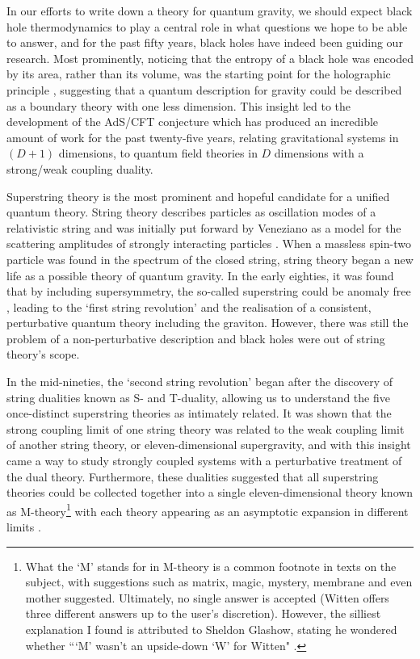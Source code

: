 In our efforts to write down a theory for quantum gravity, we should expect black hole thermodynamics to play a central role in what questions we hope to be able to answer, and for the past fifty years, black holes have indeed been guiding our research. Most prominently, noticing that the entropy of a black hole was encoded by its area, rather than its volume, was the starting point for the holographic principle \cite{tHooft:1993dmi, Susskind:1994vu}, suggesting that a quantum description for gravity could be described as a boundary theory with one less dimension. This insight led to the development of the AdS/CFT conjecture \cite{Maldacena:1997re, Witten:1998qj} which has produced an incredible amount of work for the past twenty-five years, relating gravitational systems in $(D+1)$ dimensions, to quantum field theories in $D$ dimensions with a strong/weak coupling duality. 

Superstring theory \cite{Green:1987sp, Polchinski:1998rr} is the most prominent and hopeful candidate for a unified quantum theory. String theory describes particles as oscillation modes of a relativistic string and was initially put forward by Veneziano as a model for the scattering amplitudes of strongly interacting particles \cite{Veneziano:1968yb}. When a massless spin-two particle was found in the spectrum of the closed string, string theory began a new life as a possible theory of quantum gravity. In the early eighties, it was found that by including supersymmetry, the so-called superstring could be anomaly free \cite{Green:1981yb, Green:1984sg}, leading to the `first string revolution' and the realisation of a consistent, perturbative quantum theory including the graviton. However, there was still the problem of a non-perturbative description and black holes were out of string theory's scope. 

In the mid-nineties, the `second string revolution' began after the discovery of string dualities known as S- and T-duality, allowing us to understand the five once-distinct superstring theories as intimately related. It was shown that the strong coupling limit of one string theory was related to the weak coupling limit of another string theory, or eleven-dimensional supergravity, and with this insight came a way to study strongly coupled systems with a perturbative treatment of the dual theory. Furthermore, these dualities suggested that all superstring theories could be collected together into a single eleven-dimensional theory known as M-theory\footnote{What the `M' stands for in M-theory is a common footnote in texts on the subject, with suggestions such as matrix, magic, mystery, membrane and even mother suggested. Ultimately, no single answer is accepted (Witten offers three different answers up to the user's discretion). However, the silliest explanation I found is attributed to Sheldon Glashow, stating he wondered whether ```M' wasn't an upside-down `W' for Witten" \cite{holt_2006}.} with each theory appearing as an asymptotic expansion in different limits \cite{Witten:1995ex}.

